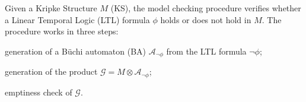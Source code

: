 Given a Kripke Structure $M$ (KS), the model checking procedure verifies whether a Linear Temporal Logic (LTL) formula $\phi$ holds or does not hold in $M$. 
The procedure works in three steps:
\begin{enumerate*}[label={(\arabic*)}]
\item generation of a B{\"u}chi automaton (BA) $\mathcal{A}_{\lnot\phi}$ from the LTL formula $\neg \phi$;
\item generation of the product $\mathcal{G}=M \otimes\mathcal{A}_{\lnot\phi}$;
\item emptiness check of $\mathcal{G}$.
\end{enumerate*}



